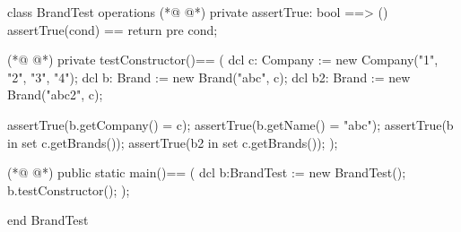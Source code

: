 \begin{vdmpp}[breaklines=true]
class BrandTest
 operations
(*@
\label{assertTrue:3}
@*)
  private assertTrue: bool ==> ()
    assertTrue(cond) == return
    pre cond;
    
(*@
\label{testConstructor:7}
@*)
  private testConstructor()==
  (
   dcl c: Company := new Company("1", "2", "3", "4");
   dcl b: Brand := new Brand("abc", c);
   dcl b2: Brand := new Brand("abc2", c);

   assertTrue(b.getCompany() = c);
   assertTrue(b.getName() = "abc");
   assertTrue(b in set c.getBrands());
   assertTrue(b2 in set c.getBrands());
  );
 
(*@
\label{main:19}
@*)
  public static main()==
    (
   dcl b:BrandTest := new BrandTest();
   b.testConstructor();
    );

end BrandTest
\end{vdmpp}

